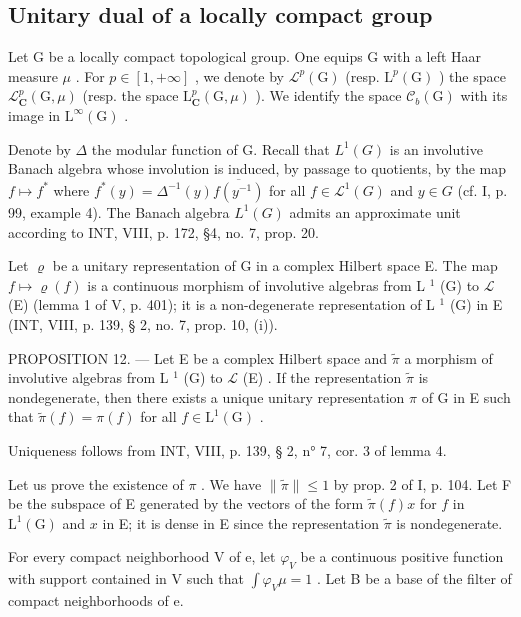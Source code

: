 \subsection{Unitary dual of a locally compact group}

Let G be a locally compact topological group. One equips G with a left Haar measure \(\mu\) . For \(p \in [1, +\infty]\) , we denote by \(\mathcal{L}^{p}(\mathrm{G})\) (resp. \(\mathrm{L}^{p}(\mathrm{G})\) ) the space \(\mathcal{L}_{\mathbf{C}}^{p}(\mathrm{G}, \mu)\) (resp. the space \(\mathrm{L}_{\mathbf{C}}^{p}(\mathrm{G}, \mu)\) ). We identify the space \(\mathcal{C}_{b}(\mathrm{G})\) with its image in \(\mathrm{L}^{\infty}(\mathrm{G})\) .

Denote by \(\Delta\) the modular function of G. Recall that \(L^1(G)\) is an involutive Banach algebra whose involution is induced, by passage to quotients, by the map \(f \mapsto f^*\) where \(f^*(y) = \Delta^{-1}(y)\overline{f(y^{-1})}\) for all \(f \in \mathcal{L}^1(G)\) and \(y \in G\) (cf. I, p. 99, example 4). The Banach algebra \(L^1(G)\) admits an approximate unit according to INT, VIII, p. 172, §4, no. 7, prop. 20.

Let \(\varrho\) be a unitary representation of G in a complex Hilbert space E. The map \(f\mapsto\varrho(f)\) is a continuous morphism of involutive algebras from L \(^{1}\) (G) to \(\mathcal{L}\) (E) (lemma 1 of V, p. 401); it is a non-degenerate representation of L \(^{1}\) (G) in E (INT, VIII, p. 139, § 2, no. 7, prop. 10, (i)).

PROPOSITION 12. --- Let E be a complex Hilbert space and \(\widetilde{\pi}\) a morphism of involutive algebras from L \(^{1}\) (G) to \(\mathcal{L}\) (E) . If the representation \(\widetilde{\pi}\) is nondegenerate, then there exists a unique unitary representation \(\pi\) of G in E such that \(\widetilde{\pi}(f)=\pi(f)\) for all \(f\in\mathrm{L}^{1}(\mathrm{G})\) .

Uniqueness follows from INT, VIII, p. 139, § 2, n° 7, cor. 3 of lemma 4.

Let us prove the existence of \(\pi\) . We have \(\| \widetilde{\pi}\| \leqslant 1\) by prop. 2 of I, p. 104. Let F be the subspace of E generated by the vectors of the form \(\widetilde{\pi}(f)x\) for \(f\) in \(\mathrm{L}^1 (\mathrm{G})\) and \(x\) in E; it is dense in E since the representation \(\widetilde{\pi}\) is nondegenerate.

For every compact neighborhood V of e, let \(\varphi_{V}\) be a continuous positive function with support contained in V such that \(\int\varphi_{V}\mu=1\) . Let B be a base of the filter of compact neighborhoods of e.

